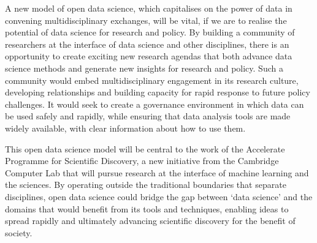 \documentclass[a4paper]{caesar_book}
\let\oldchapter\chapter
\def\chapter{%
  \setcounter{footnote}{0}%
  \oldchapter
}
\begin{document}
A new model of open data science, which capitalises on the power of data in convening multidisciplinary exchanges, will be vital, if we are to realise the potential of data science for research and policy. By building a community of researchers at the interface of data science and other disciplines, there is an opportunity to create exciting new research agendas that both advance data science methods and generate new insights for research and policy. Such a community would embed multidisciplinary engagement in its research culture, developing relationships and building capacity for rapid response to future policy challenges. It would seek to create a governance environment in which data can be used safely and rapidly, while ensuring that data analysis tools are made widely available, with clear information about how to use them.

This open data science model will be central to the work of the Accelerate Programme for Scientific Discovery, a new initiative from the Cambridge Computer Lab that will pursue research at the interface of machine learning and the sciences. By operating outside the traditional boundaries that separate disciplines, open data science could bridge the gap between ‘data science’ and the domains that would benefit from its tools and techniques, enabling ideas to spread rapidly and ultimately advancing scientific discovery for the benefit of society.




\end{document}
